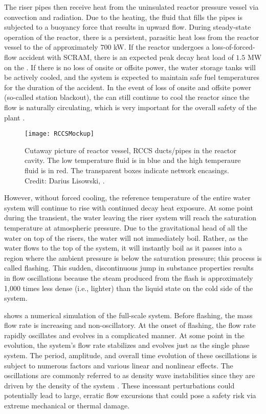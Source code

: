 The riser pipes then receive heat from the uninsulated reactor pressure vessel via convection and radiation.
Due to the heating, the fluid that fills the pipes is subjected to a buoyancy force that results in upward flow.
During steady-state operation of the reactor, there is a persistent, parasitic heat loss from the reactor vessel to the  of approximately $700$ kW.
If the reactor undergoes a loss-of-forced-flow accident with SCRAM, there is an expected peak decay heat load of $1.5$ MW on the .
If there is no loss of onsite or offsite power, the  water storage tanks will be actively cooled, and the system is expected to maintain safe fuel temperatures for the duration of the accident.
In the event of loss of onsite and offsite power (so-called station blackout), the  can still continue to cool the reactor since the flow is naturally circulating, which is very important for the overall safety of the plant \cite[\S{50.63}]{nuclear_regulatory_comminission_u.s._2007}.

\begin{figure}%
\centering
    \caption[RCCS near-reactor-riser system]{   Cutaway picture of reactor vessel, RCCS ducts/pipes in the reactor cavity.  
                The low temperature fluid is in blue and the high temperaure fluid is in red.  
                The transparent boxes indicate network encasings. 
                Credit: Darius Lisowski, \TheUniversity.}%
    \label{Figure:RCCSMockup}%
    \texttt{[image: RCCSMockup]}%
\end{figure}

However, without forced cooling, the reference temperature of the entire water system will continue to rise with continued decay heat exposure.
At some point during the transient, the water leaving the riser system will reach the saturation temperature at atmospheric pressure.  
Due to the gravitational head of all the water on top of the risers, the water will not immediately boil.
Rather, as the water flows to the top of the system, it will instantly boil as it passes into a region where the ambient pressure is below the saturation pressure; this process is called flashing.
This sudden, discontinuous jump in substance properties results in flow oscillations because the steam produced from the flash is approximately 1,000 times less dense (i.e., lighter) than the liquid state on the cold side of the system.

 shows a numerical simulation of the full-scale system.
Before flashing, the mass flow rate is increasing and non-oscillatory.
At the onset of flashing, the flow rate rapidly oscillates and evolves in a complicated manner.
At some point in the evolution, the system's flow rate stabilizes and evolves just as the single phase system.
The period, amplitude, and overall time evolution of these oscillations is subject to numerous factors and various linear and nonlinear effects.
The oscillations are commonly referred to as density wave instabilities since they are driven by the density of the system \cite{achard_analysis_1985}.
These incessant perturbations could potentially lead to large, erratic flow excursions that could pose a safety risk 
via extreme mechanical or thermal damage.

